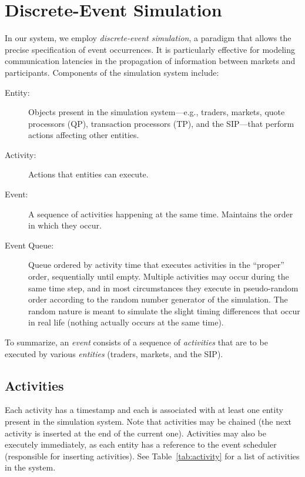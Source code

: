 \documentclass[11pt]{article}
\begin{document}
\section{Discrete-Event Simulation}

In our system, we employ \emph{discrete-event simulation}, a paradigm that
allows the precise specification of event occurrences. It is particularly
effective for modeling communication latencies in the propagation of information between markets and participants.
Components of the simulation system include:

\begin{description}
\item[Entity:] Objects present in the simulation system---e.g., traders, markets, quote processors (QP), transaction processors (TP), and the SIP---that perform actions affecting other entities.

\item[Activity:] Actions that entities can execute.

\item[Event:] A sequence of activities happening at the same time. Maintains the
  order in which they occur.

\item[Event Queue:] Queue ordered by activity time that executes activities in
  the ``proper'' order, sequentially until empty. Multiple activities may occur
  during the same time step, and in most circumstances they
  execute in pseudo-random order according to the random number generator of the
  simulation. The random nature is meant to simulate the slight timing
  differences that occur in real life (nothing actually occurs at the same
  time).
\end{description}

To summarize, an \emph{event} consists of a sequence of \emph{activities} that
are to be executed by various \emph{entities} (traders, markets, and the SIP).


\subsection{Activities}

Each activity has a timestamp and each is associated with at least one entity
present in the simulation system. Note that activities may be chained (the next activity is inserted at the end of the current one).
Activities may also be executely immediately, as each entity has a reference to the event scheduler (responsible for inserting activities). See
Table~\ref{tab:activity} for a list of activities in the system.
\end{document}
